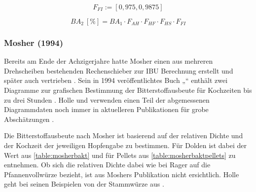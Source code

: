 \documentclass[a4paper,parskip=half]{scrartcl}
\newcommand{\BA}{\mathit{BA}}
\newcommand{\uper}{\:[\text{\%}]}
\newcommand{\FAH}{F_{\mathit{AH}}}
\newcommand{\FHF}{F_{\mathit{HF}}}
\newcommand{\FHS}{F_{\mathit{HS}}}
\newcommand{\FFil}{F_{\mathit{FI}}}
\begin{document}
\begin{equation}
\FFil := \left[0,975, 0,9875 \right]
\label{eq:garetzfil}
\end{equation}

\begin{equation}
\BA_2 \uper = BA_1 \cdot \FAH \cdot \FHF \cdot \FHS \cdot \FFil
\label{eq:garetzba2}
\end{equation}

\subsubsection*{Mosher (1994)}

Bereits am Ende der Achzigerjahre hatte Mosher einen aus mehreren
Drehscheiben bestehenden Rechenschieber zur IBU Berechnung erstellt und später
auch vertrieben \parencite{Mosher2022}. Sein in 1994 veröffentlichtes
Buch „“ enthält zwei Diagramme zur grafischen
Bestimmung der Bitterstoffausbeute für Kochzeiten bis zu drei Stunden
\parencite[160\psq]{Mosher1994}. Holle und \citeauthor{Thesseling2019} verwenden
einen Teil der abgemessenen Diagrammdaten noch immer in aktuelleren
Publikationen für grobe Abschätzungen \parencites[51]{Holle2010}{Thesseling2019}.

Die Bitterstoffausbeute nach Mosher ist basierend auf der relativen Dichte und
der Kochzeit der jeweiligen Hopfengabe zu bestimmen. Für Dolden ist
dabei der Wert aus \autoref{table:mosherbakt} und für Pellets aus
\autoref{table:mosherbaktpellets} zu entnehmen. Ob sich die
relativen Dichte dabei wie bei Rager auf die Pfannenvollwürze bezieht, ist aus Moshers Publikation nicht ersichtlich. Holle geht bei seinen Beispielen
von der Stammwürze aus \parencite[53]{Holle2010}.
\end{document}
